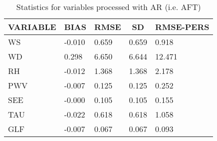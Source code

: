 \begin{table}[]
\begin{center}
\begin{tabular}{|l|l|l|l|l|}
\hline
\multicolumn{1}{c|}{\cellcolor[HTML]{C0C0C0}\textbf{VARIABLE}} & \multicolumn{1}{c|}{\cellcolor[HTML]{C0C0C0}\textbf{BIAS}} & \multicolumn{1}{c|}{\cellcolor[HTML]{C0C0C0}\textbf{RMSE}} & \multicolumn{1}{c|}{\cellcolor[HTML]{C0C0C0}\textbf{SD}} & \multicolumn{1}{c|}{\cellcolor[HTML]{C0C0C0}\textbf{RMSE-PERS}}\\\hline
\cellcolor[HTML]{C0C0C0}WS  &    -0.010                                &     0.659                                &     0.659  &     0.918 \\
\cellcolor[HTML]{C0C0C0}WD  &     0.298                                &     6.650                                &     6.644  &    12.471 \\
\cellcolor[HTML]{C0C0C0}RH  &    -0.012                                &     1.368                                &     1.368  &     2.178 \\
\cellcolor[HTML]{C0C0C0}PWV &    -0.007                               &     0.125                               &     0.125 &     0.252 \\
\cellcolor[HTML]{C0C0C0}SEE &    -0.000                               &     0.105                               &     0.105 &     0.155 \\
\cellcolor[HTML]{C0C0C0}TAU &    -0.022                               &     0.618                               &     0.618 &     1.058 \\
\cellcolor[HTML]{C0C0C0}GLF &    -0.007                               &     0.067                               &     0.067 &     0.093 \\
\hline
\end{tabular}
\caption{Statistics for variables processed with AR (i.e. AFT)}
\end{center}
\end{table}
